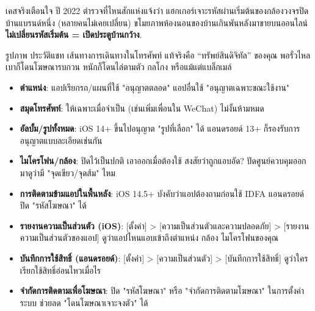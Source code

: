 \begin{tcbwarn}{เคสจริงเตือนใจ}
ปี 2022 ตำรวจที่ไหนสักแห่งแจ้งว่า แฮกเกอร์เจาะรหัสผ่านเริ่มต้นของกล้องวงจรปิดบ้านแบรนด์หนึ่ง (หลายคนไม่เคยเปลี่ยน) ขโมยภาพห้องนอนของบ้านเกินพันหลังมาขายบนออนไลน์\textbf{ไม่เปลี่ยนรหัสเริ่มต้น = เปิดประตูบ้านกว้าง}.

\end{tcbwarn}


รูปภาพ ประวัติแชท เส้นทางการเดินทางในโทรศัพท์ แท้จริงคือ “ทรัพย์สินดิจิทัล” ของคุณ พอรั่วไหลเบาก็โดนโฆษณารบกวน หนักก็โดนไล่ตามตัว กลโกง หรือแม้แต่แบล็กเมล์


\begin{itemize}
  \item \textbf{ตำแหน่ง}: แอปเรียกรถ/แผนที่ใช้ "อนุญาตตลอด" แอปอื่นใช้ "อนุญาตเฉพาะขณะใช้งาน"
  \item \textbf{สมุดโทรศัพท์}: ให้เฉพาะเมื่อจำเป็น (เช่นเพิ่มเพื่อนใน WeChat) ไม่งั้นห้ามหมด
  \item \textbf{อัลบั้ม/รูปทั้งหมด}: iOS 14+ ขึ้นไปอนุญาต "รูปที่เลือก" ได้ แอนดรอยด์ 13+ ก็รองรับการอนุญาตแบบละเอียดเช่นกัน
  \item \textbf{ไมโครโฟน/กล้อง}: ปิดไว้เป็นปกติ เอาออกเมื่อต้องใช้ สงสัยว่าถูกแอบอัด? ปัดศูนย์ควบคุมออกมาดูว่ามี "จุดเขียว/จุดส้ม" ไหม
  \item \textbf{การติดตามข้ามแอปในพื้นหลัง}: iOS 14.5+ บังคับว่าแอปต้องถามก่อนใช้ IDFA แอนดรอยด์ปิด "รหัสโฆษณา" ได้
\end{itemize}


\begin{itemize}
  \item \textbf{รายงานความเป็นส่วนตัว (iOS)}: [ตั้งค่า] > [ความเป็นส่วนตัวและความปลอดภัย] > [รายงานความเป็นส่วนตัวของแอป] ดูว่าแอปไหนแอบเข้าถึงตำแหน่ง กล้อง ไมโครโฟนของคุณ
  \item \textbf{บันทึกการใช้สิทธิ์ (แอนดรอยด์)}: [ตั้งค่า] > [ความเป็นส่วนตัว] > [บันทึกการใช้สิทธิ์] ดูว่าใครเรียกใช้สิทธิ์อ่อนไหวเมื่อไร
  \item \textbf{จำกัดการติดตามเพื่อโฆษณา}: ปิด "รหัสโฆษณา" หรือ "จำกัดการติดตามโฆษณา" ในการตั้งค่าระบบ ช่วยลด "โดนโฆษณาเจาะจงตัว" ได้
\end{itemize}


